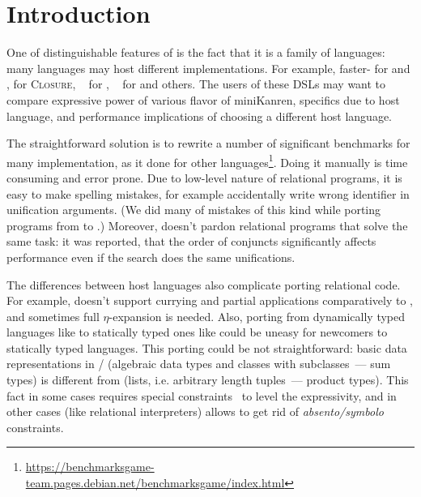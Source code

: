 

\section{Introduction}
\label{sec:intro}


One of distinguishable features of \miniKanren{} is the fact that it is a family of languages:
many languages may host different \miniKanren{} implementations.
For example, faster-\miniKanren{} for \Scheme{} and \Racket{}, \CoreLogic{} for \textsc{Closure}, \OCanren{}~\cite{OCanren} for \OCaml{}, \Klogic{}~\cite{Klogic2023} for \Kotlin{} and others.
The users of these DSLs may want to compare expressive power of various flavor of miniKanren, specifics due to host language, and performance implications of choosing a different host language.


The straightforward solution is to rewrite a number of significant benchmarks for many implementation, as it done for other languages\footnote{\url{https://benchmarksgame-team.pages.debian.net/benchmarksgame/index.html}}.
Doing it manually is time consuming and error prone.
Due to low-level nature of relational programs, it is easy to make spelling mistakes, for example accidentally write wrong identifier in unification arguments.
(We did many of mistakes of this kind while porting programs from \OCanren{} to \Klogic{}.) Moreover, \miniKanren{} doesn't pardon relational programs that solve the same task: it was reported, that the order of conjuncts significantly affects~\cite{scheduling2022} performance even if the search does the same unifications.

The differences between host languages also complicate porting relational code.
For example, \Kotlin{} doesn't support currying and partial applications comparatively to \OCaml{}, and sometimes full $\eta$-expansion is needed.
Also, porting from dynamically typed languages like \Scheme{} to statically typed ones like \OCaml{} could be uneasy for newcomers to statically typed languages.
This porting could be not straightforward:
basic data representations in \OCaml{}/\Klogic{} (algebraic data types and classes with subclasses~--- sum types) is different from \Scheme{} (lists, i.e. arbitrary length tuples~--- product types).
This fact in some cases requires special constraints~\cite{Wildcards2023} to level the expressivity, and in other cases (like relational interpreters) allows to get rid of \emph{absento/symbolo} constraints.

